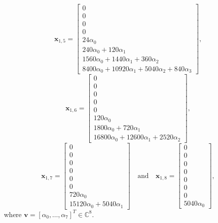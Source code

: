 \begin{example}
\begin{displaymath}
\end{displaymath}
\begin{displaymath}
\boldsymbol{x}_{1,5} = \left[\begin{matrix}0\\0\\0\\0\\24 \alpha_{0}\\240 \alpha_{0} + 120 \alpha_{1}\\1560 \alpha_{0} + 1440 \alpha_{1} + 360 \alpha_{2}\\8400 \alpha_{0} + 10920 \alpha_{1} + 5040 \alpha_{2} + 840 \alpha_{3}\end{matrix}\right],
\end{displaymath}
\begin{displaymath}
\boldsymbol{x}_{1,6} = \left[\begin{matrix}0\\0\\0\\0\\0\\120 \alpha_{0}\\1800 \alpha_{0} + 720 \alpha_{1}\\16800 \alpha_{0} + 12600 \alpha_{1} + 2520 \alpha_{2}\end{matrix}\right],
\end{displaymath}
\begin{displaymath}
\boldsymbol{x}_{1,7} = \left[\begin{matrix}0\\0\\0\\0\\0\\0\\720 \alpha_{0}\\15120 \alpha_{0} + 5040 \alpha_{1}\end{matrix}\right]
\quad\text{and}\quad \boldsymbol{x}_{1,8} = \left[\begin{matrix}0\\0\\0\\0\\0\\0\\0\\5040 \alpha_{0}\end{matrix}\right],
\end{displaymath}
where $\boldsymbol{v} = [\alpha_{0}, \ldots, \alpha_{7}]^{T} \in \mathbb{C}^{8}$.
\label{example:pascal:generalized:eigenvectors}
\end{example}

